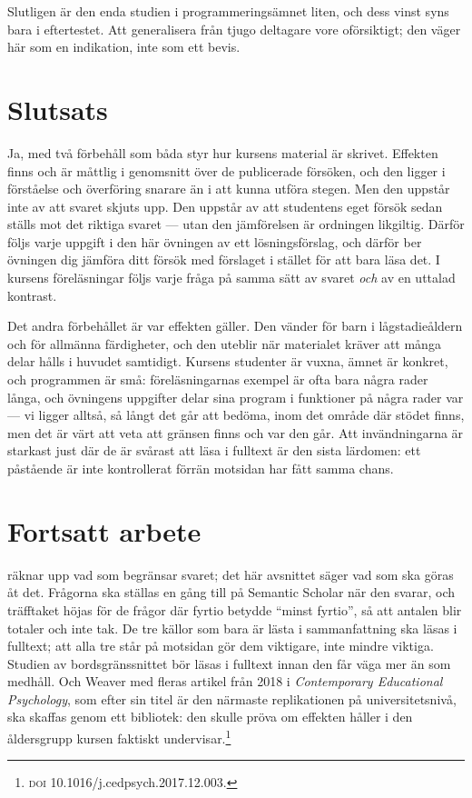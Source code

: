 Slutligen är den enda studien i programmeringsämnet liten, och dess vinst
syns bara i eftertestet.  Att generalisera från tjugo deltagare vore
oförsiktigt; den väger här som en indikation, inte som ett bevis.

\section{Slutsats}
\label{sec:pf-slutsats}

Ja, med två förbehåll som båda styr hur kursens material är skrivet.
Effekten finns och är måttlig i genomsnitt över de publicerade försöken, och
den ligger i förståelse och överföring snarare än i att kunna utföra stegen.
Men den uppstår inte av att svaret skjuts upp.  Den uppstår av att
studentens eget försök sedan ställs mot det riktiga svaret --- utan den
jämförelsen är ordningen likgiltig.  Därför följs varje uppgift i den här
övningen av ett lösningsförslag, och därför ber övningen dig jämföra ditt
försök med förslaget i stället för att bara läsa det.  I kursens
föreläsningar följs varje fråga på samma sätt av svaret \emph{och} av en
uttalad kontrast.

Det andra förbehållet är var effekten gäller.  Den vänder för barn i
lågstadieåldern och för allmänna färdigheter, och den uteblir när materialet
kräver att många delar hålls i huvudet samtidigt.  Kursens studenter är
vuxna, ämnet är konkret, och programmen är små: föreläsningarnas exempel är
ofta bara några rader långa, och övningens uppgifter delar sina program i
funktioner på några rader var --- vi ligger alltså, så långt det går att
bedöma, inom det område där stödet finns, men det är värt att veta att
gränsen finns och var den går.  Att invändningarna är
starkast just där de är svårast att läsa i fulltext är den sista lärdomen:
ett påstående är inte kontrollerat förrän motsidan har fått samma chans.

\section{Fortsatt arbete}
\label{sec:pf-fortsatt}

 räknar upp vad som begränsar svaret; det här
avsnittet säger vad som ska göras åt det.  Frågorna ska ställas en gång
till på Semantic Scholar när den svarar, och träfftaket
höjas för de frågor där fyrtio betydde \enquote{minst fyrtio}, så att
antalen blir totaler och inte tak.  De tre källor som bara är lästa i
sammanfattning ska läsas i
fulltext\autocite{Ashman2020,Nachtigall2020,ChaseKlahr2017}; att alla
tre står på motsidan gör dem viktigare, inte mindre viktiga.  Studien
av bordsgränssnittet\autocite{SchneiderBlikstein2016} bör läsas i
fulltext innan den får väga mer än som medhåll.  Och Weaver
med fleras artikel från 2018 i \emph{Contemporary Educational
Psychology}, som efter sin titel är den närmaste replikationen på
universitetsnivå, ska skaffas genom ett bibliotek: den skulle pröva om
effekten håller i den åldersgrupp kursen faktiskt
undervisar.\footnote{\textsc{doi} 10.1016/j.cedpsych.2017.12.003.}

